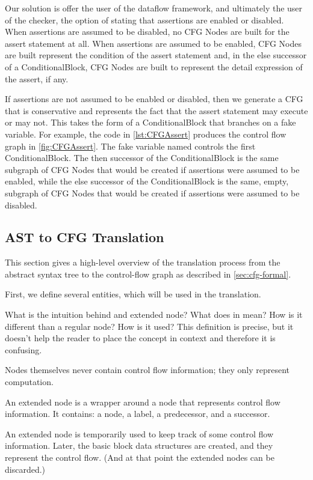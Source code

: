 Our solution is offer the user of the dataflow framework, and ultimately the user of the checker, the option of stating that assertions are enabled or disabled.  When assertions are assumed to be disabled, no CFG Nodes are built for the assert statement at all.  When assertions are assumed to be enabled, CFG Nodes are built represent the condition of the assert statement and, in the else successor of a ConditionalBlock, CFG Nodes are built to represent the detail expression of the assert, if any.

If assertions are not assumed to be enabled or disabled, then we generate a CFG that is conservative and represents the fact that the assert statement may execute or may not.  This takes the form of a ConditionalBlock that branches on a fake variable.  For example, the code in \autoref{lst:CFGAssert} produces the control flow graph in \autoref{fig:CFGAssert}.  The fake variable named  controls the first ConditionalBlock.  The then successor of the ConditionalBlock is the same subgraph of CFG Nodes that would be created if assertions were assumed to be enabled, while the else successor of the ConditionalBlock is the same, empty, subgraph of CFG Nodes that would be created if assertions were assumed to be disabled.


\subsection{AST to CFG Translation}
\label{sec:ast_to_cfg_translation}

This section gives a high-level overview of the translation process from the
abstract syntax tree to the control-flow graph as described in \autoref{sec:cfg-formal}.

First, we define several entities, which will be used in the translation.

\begin{workinprogress}
What is the intuition behind and extended node?  What does in mean?  How is
it different than a regular node?  How is it used?  This definition is
precise, but it doesn't help the reader to place the concept in context and
therefore it is confusing.
\end{workinprogress}

\begin{workinprogress}
Nodes themselves never contain control flow information; they only
represent computation.

An extended node is a wrapper around a node that represents control flow
information.  It contains:  a node, a label, a predecessor, and a
successor.

An extended node is temporarily used to keep track of some control flow
information.  Later, the basic block data structures are created, and they
represent the control flow.  (And at that point the extended nodes can be
discarded.)
\end{workinprogress}

